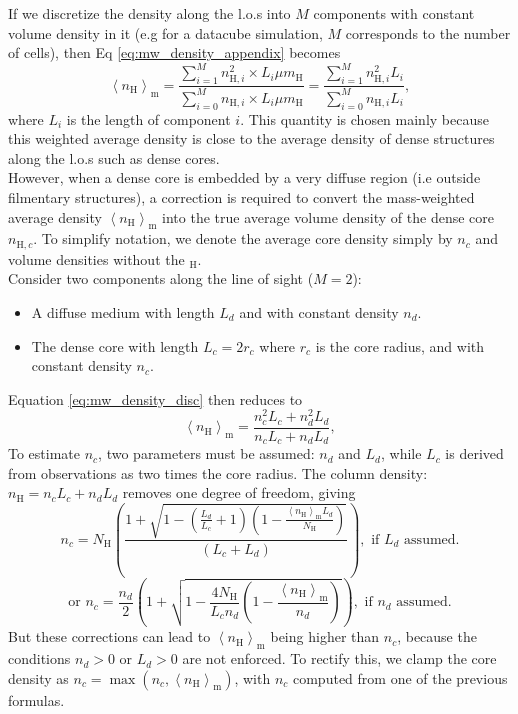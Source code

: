 \documentclass{aa}
\newcommand{\aver}[1]{\ensuremath{\left\langle #1 \right\rangle}}
\newcommand{\nh}{\ensuremath{n_\text{H}}}
\newcommand{\Nh}{\ensuremath{N_\text{H}}}
\newcommand{\nmh}{\ensuremath{\aver{\nh}_{\text{m}}}}
\begin{document}
\begin{appendix}
   If we discretize the density along the l.o.s into $M$ components with constant volume density in it
    (e.g for a datacube simulation, $M$ corresponds to the number of cells), then Eq \ref{eq:mw_density_appendix} becomes 
   \begin{equation}
    \label{eq:mw_density_disc}
     \nmh =\frac{\sum_{i=1}^{M}n^2_{\text{H},i}\times L_i\mu m_\text{H}}{\sum_{i=0}^{M}n_{\text{H},i}\times L_i\mu m_\text{H}}=
     \frac{\sum_{i=1}^{M}n^2_{\text{H},i}L_i}{\sum_{i=0}^{M}n_{\text{H},i}L_i},
   \end{equation}
   where $L_i$ is the length of component $i$.
   This quantity is chosen mainly because this weighted average density is close to the average density of dense structures along the l.o.s such as dense cores.
   \\ 
   However, when a dense core is embedded by a very diffuse region (i.e outside filmentary structures), a correction is required to convert the mass-weighted average density
   $\nmh$ into the true average volume density of the dense core $n_{\text{H},c}$. To simplify notation, we denote the average core density simply by $n_c$ and volume densities without the $_\text{H}$.
   \\
   Consider two components along the line of sight ($M=2$):
   \begin{itemize}
    \item A diffuse medium with length $L_d$ and with constant density $n_d$.
    \item The dense core with length $L_c=2r_c$ where $r_c$ is the core radius, and with constant density $n_c$. 
   \end{itemize}
   Equation \ref{eq:mw_density_disc} then reduces to
   \begin{equation}
    \label{eq:mw_density_twomeds}
     \nmh=
     \frac{n^2_{c}L_c+n^2_{d}L_d}{n_{c}L_c+n_{d}L_d},
   \end{equation}
   To estimate $n_c$, two parameters must be assumed: $n_d$ and $L_d$, while $L_c$ is derived from observations as two times the core radius.
   The column density: $\nh=n_{c}L_c+n_{d}L_d$ removes one degree of freedom, giving 
   \begin{equation}
    \label{eq:mw_density_twomeds_ld}
     n_c=
     \Nh\left(\frac{1+\sqrt{1-(\frac{L_d}{L_c}+1)(1-\frac{\nmh L_d}{\Nh})}}{(L_c+L_d)}\right)
     ,\text{ if }L_d\text{ assumed.}
   \end{equation}
   \begin{equation}
    \label{eq:mw_density_twomeds_nd}
     \text{or }n_c=
     \frac{n_d}{2}\left(1+\sqrt{1-\frac{4\Nh}{L_c n_d}(1-\frac{\nmh}{n_d})}\right)
     ,\text{ if }n_d\text{ assumed.}
   \end{equation}
   But these corrections can lead to $\nmh$ being higher than $n_c$, because the conditions $n_d>0$ or $L_d>0$ are not enforced. 
   To rectify this, we clamp the core density as $n_c = \max(n_c, \nmh)$, with $n_c$ computed from one of the previous formulas. 


\end{appendix}
\end{document}
